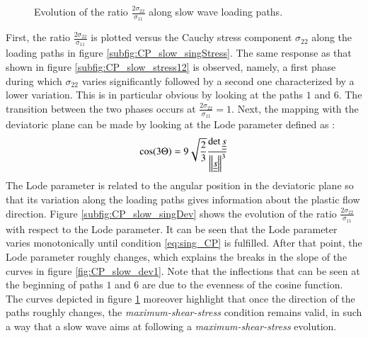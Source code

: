 \begin{figure}[h!]
  \centering
  { \label{subfig:CP_slow_singStress} }
  { \label{subfig:CP_slow_singDev} }
  
  \caption{Evolution of the ratio $\frac{2\sigma_{22}}{\sigma_{11}}$ along slow wave loading paths.}
  \label{fig:CP_slow_sing}
\end{figure}
First, the ratio $\frac{2\sigma_{22}}{\sigma_{11}}$ is plotted versus the Cauchy stress component $\sigma_{22}$ along the loading paths in figure \ref{subfig:CP_slow_singStress}.
The same response as that shown in figure \ref{subfig:CP_slow_stress12} is observed, namely, a first phase during which $\sigma_{22}$ varies significantly followed by a second one characterized by a lower variation.
This is in particular obvious by looking at the paths $1$ and $6$. 
The transition between the two phases occurs at $\frac{2\sigma_{22}}{\sigma_{11}}=1$.  
Next, the mapping with the deviatoric plane can be made by looking at the Lode parameter defined as \cite{LodeAngle}:
\begin{equation}
  \label{eq:Lode_Angle}
  \cos (3\Theta) = 9\sqrt{\frac{2}{3}} \frac{\det {\underline{\underline{s}}}}{\left\Vert{\underline{\underline{s}}}\right\Vert^3}
\end{equation}
The Lode parameter is related to the angular position in the deviatoric plane so that its variation along the loading paths gives information about the plastic flow direction.
Figure \ref{subfig:CP_slow_singDev} shows the evolution of the ratio $\frac{2\sigma_{22}}{\sigma_{11}}$ with respect to the Lode parameter.
It can be seen that the Lode parameter varies monotonically until condition \eqref{eq:sing_CP} is fulfilled.
After that point, the Lode parameter roughly changes, which explains the breaks in the slope of the curves in figure \ref{fig:CP_slow_dev1}.
Note that the inflections that can be seen at the beginning of paths $1$ and $6$ are due to the evenness of the cosine function.
The curves depicted in figure \ref{fig:CP_slow_sing} moreover highlight that once the direction of the paths roughly changes, the \textit{maximum-shear-stress} condition remains valid, in such a way that a slow wave aims at following a \textit{maximum-shear-stress} evolution.


